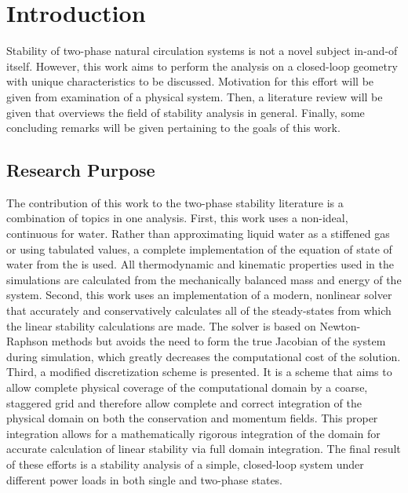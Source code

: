 \chapter{Introduction}

Stability of two-phase natural circulation systems is not a novel subject in-and-of itself.
However, this work aims to perform the analysis on a closed-loop geometry with unique characteristics to be discussed.
Motivation for this effort will be given from examination of a physical system.
Then, a literature review will be given that overviews the field of stability analysis in general.
Finally, some concluding remarks will be given pertaining to the goals of this work.

\newpage
{}

\section{Research Purpose}\label{Section:Purpose}

The contribution of this work to the two-phase stability literature is a combination of topics in one analysis.
First, this work uses a non-ideal, continuous  for water.
Rather than approximating liquid water as a stiffened gas \cite{hayward_compressibility_1967-1} or using tabulated values, a complete implementation of the equation of state of water from the  is used.
All thermodynamic and kinematic properties used in the simulations are calculated from the mechanically balanced mass and energy of the system.
Second, this work uses an implementation of a modern, nonlinear solver that accurately and conservatively calculates all of the steady-states from which the linear stability calculations are made.
The solver is based on Newton-Raphson methods but avoids the need to form the true Jacobian of the system during simulation, which greatly decreases the computational cost of the solution.
Third, a modified discretization scheme is presented.
It is a scheme that aims to allow complete physical coverage of the computational domain by a coarse, staggered grid and therefore allow complete and correct integration of the physical domain on both the conservation and momentum fields.
This proper integration allows for a mathematically rigorous integration of the domain for accurate calculation of linear stability via full domain integration.
The final result of these efforts is a stability analysis of a simple, closed-loop system under different power loads in both single and two-phase states.






